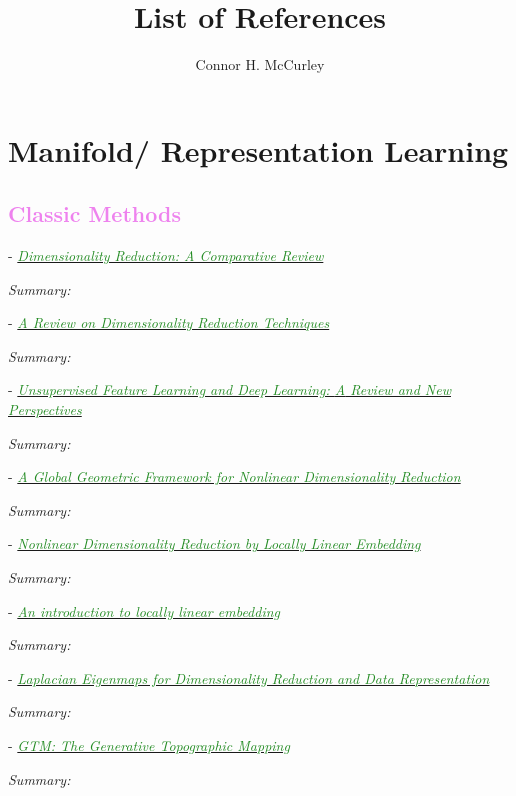 \documentclass[]{article}
\title{List of References}
\author{Connor H. McCurley}
\date{}
\newcommand{\paperentry}[4]{
            \hangindent=1cm
            \textcolor{red}{\cite{#1}} - \href{run:../References/#3}{\textcolor{ForestGreen}{\textit{#2}}}
            
            \noindent            
            \begin{minipage}[t]{0.1\linewidth}\hfill\end{minipage}
            \begin{minipage}[t]{0.8\linewidth}\textcolor{NavyBlue}{{\textit{Summary:}}}#4\end{minipage}
            \vspace{.25cm}
          }
\begin{document}
\maketitle

\tableofcontents

\newpage

      
\section{Manifold/ Representation Learning}

	\textcolor{Violet}{\subsection{Classic Methods}}

	\paperentry{VanDerMaaten2009DRReview}
	{Dimensionality Reduction: A Comparative Review}
	{Manifold_Representation_Learning/Reviews/VanDerMaaten2009DRReview.pdf}
	{}
	
	\paperentry{Jindal2017ReviewDRTechniques}
	{A Review on Dimensionality Reduction Techniques}
	{Manifold_Representation_Learning/Reviews/Jindal2017ReviewDRTechniques.pdf}
	{}

	\paperentry{Bengio2014RepLearningReview}
	{Unsupervised Feature Learning and Deep Learning: {A} Review and New Perspectives}
	{Manifold_Representation_Learning/Reviews/Bengio2014RepLearningReview.pdf}
	{}
	
	\paperentry{Tenenbaum2000Isomap}
	{A Global Geometric Framework for Nonlinear Dimensionality Reduction}
	{Manifold_Representation_Learning/Manifold/Tenenbaum2000Isomap.pdf}
	{}
	
	\paperentry{Roweis2000LLE}
	{Nonlinear Dimensionality Reduction by Locally Linear Embedding}
	{Manifold_Representation_Learning/Manifold/Roweis2000LLE.pdf}
	{}
	
	\paperentry{Saul2001LLEIntro}
	{An introduction to locally linear embedding}
	{Manifold_Representation_Learning/Manifold/Saul2001LLEIntro.pdf}
	{}
	
	\paperentry{Belkin2003LaplacianEigenmaps}
	{Laplacian Eigenmaps for Dimensionality Reduction and Data Representation}
	{Manifold_Representation_Learning/Manifold/Belkin2003LaplacianEigenmaps.pdf}
	{}
	
	
	\paperentry{Bishop1998GTM}
	{GTM: The Generative Topographic Mapping}
	{Manifold_Representation_Learning/Manifold/Bishop1998GTM.pdf}
	{}
	
\end{document}
